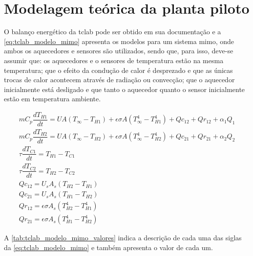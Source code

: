 \section{Modelagem teórica da planta piloto}
\label{sec:modelagem_da_planta_piloto}

O balanço energético da \acrshort{tclab} pode ser obtido em sua documentação e
a \cref{eq:tclab_modelo_mimo} apresenta os modelos
para um sistema \acrshort{mimo}, onde ambos os aquecedores e sensores são utilizados,
sendo que, para isso, deve-se assumir que: os aquecedores e o sensores de temperatura estão na
mesma temperatura; que o efeito da condução de calor é desprezado e que as únicas trocas de
calor acontecem através de radiação ou convecção; que o aquecedor inicialmente está desligado
e que tanto o aquecedor quanto o sensor inicialmente estão em temperatura ambiente.

\begin{subequations}
	\label{eq:tclab_modelo_mimo}
	\begin{gather}
		mC_p \dfrac{dT_{H1}}{dt} = UA (T_{\infty} - T_{H1}) + \epsilon \sigma A (T_{\infty}^{4} - T_{H1}^{4}) + Qc_{12} + Qr_{12} + \alpha_1 Q_1		\label{eq:tclab_modelo_mimo_a} \\
		mC_p \dfrac{dT_{H2}}{dt} = UA (T_{\infty} - T_{H2}) + \epsilon \sigma A (T_{\infty}^{4} - T_{H2}^{4}) + Qc_{21} + Qr_{21} + \alpha_2 Q_2		\label{eq:tclab_modelo_mimo_b} \\
		\tau \dfrac{dT_{C1}}{dt} = T_{H1} - T_{C1}								\\
		\tau \dfrac{dT_{C2}}{dt} = T_{H2} - T_{C2}								\\
		Qc_{12} = U_s A_s (T_{H2} - T_{H1})							\nonumber	\\
		Qc_{21} = U_s A_s (T_{H1} - T_{H2})							\nonumber	\\
		Qr_{12} = \epsilon \sigma A_s (T_{H2}^{4} - T_{H1}^{4})		\nonumber	\\
		Qr_{21} = \epsilon \sigma A_s (T_{H1}^{4} - T_{H2}^{4})		\nonumber
	\end{gather}
\end{subequations}

A \cref{tab:tclab_modelo_mimo_valores} indica a descrição de cada uma das siglas da
\cref{eq:tclab_modelo_mimo} e também apresenta o valor de cada um.

